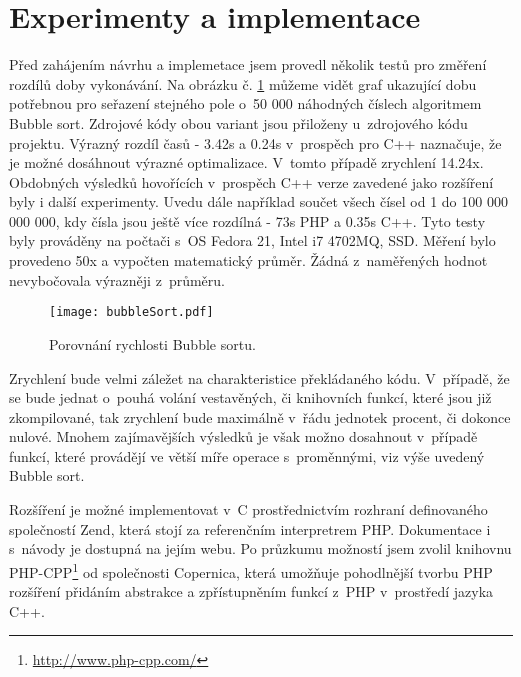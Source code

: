 \documentclass[czech]{ExcelAtFIT}
\begin{document}
\section{Experimenty a implementace}

	Před zahájením návrhu a implemetace jsem provedl několik testů pro změření rozdílů doby vykonávání. Na obrázku č. \ref{fig:bubbleSort} můžeme vidět graf ukazující dobu potřebnou pro seřazení stejného pole o~50 000 ná\-hod\-ných číslech algoritmem Bubble sort. Zdrojové kódy obou variant jsou přiloženy u~zdrojového kódu projektu. Výrazný rozdíl časů - 3.42s a 0.24s v~prospěch pro C++ naznačuje, že je možné dosáhnout výrazné optimalizace. V~tomto případě zrychlení 14.24x. Obdobných výsledků hovořících v~prospěch C++ verze zavedené jako rozšíření byly i další experimenty. U\-ve\-du dále například součet všech čísel od 1 do 100 000 000 000, kdy čísla jsou ještě více rozdílná - 73s PHP a 0.35s C++. Tyto testy byly prováděny na počtači s~OS Fedora 21, Intel i7 4702MQ, SSD. Měření bylo provedeno 50x a vypočten matematický průměr. Žádná z~naměřených hodnot nevybočovala výrazněji z~prů\-mě\-ru.


\begin{figure}[t]
	\centering
	\texttt{[image: bubbleSort.pdf]}
	\caption{Porovnání rychlosti Bubble sortu.}
	\label{fig:bubbleSort}
\end{figure}

	Zrychlení bude velmi záležet na charakteristice překládaného kódu. V~případě, že se bude jednat o~pouhá volání vestavěných, či knihovních funkcí, které jsou již zkompilované, tak zrychlení bude ma\-xi\-mál\-ně v~řádu jednotek procent, či dokonce nulové. Mnohem zajímavějších výsledků je však možno dosahnout v~případě funkcí, které provádějí ve větší míře operace s~proměnnými, viz výše uvedený Bubble sort.

	Rozšíření je možné implementovat v~C pro\-střed\-nic\-tvím rozhraní definovaného společností Zend, která stojí za referenčním interpretrem PHP. Dokumentace i s~návody je dostupná na jejím webu. Po průzkumu možností jsem zvolil knihovnu PHP-CPP\footnote{\url{http://www.php-cpp.com/}} od spo\-leč\-nos\-ti Copernica, která umožňuje pohodlnější tvorbu PHP rozšíření přidáním abstrakce a zpřístupněním funkcí z~PHP v~prostředí jazyka C++.
\end{document}
